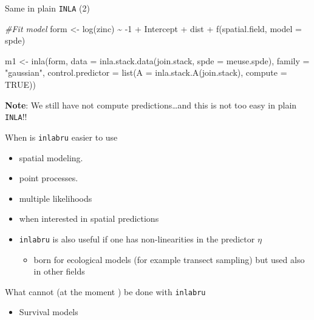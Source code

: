 \documentclass[
  ignorenonframetext,
]{beamer}
\newenvironment{Shaded}{\begin{snugshade}}{\end{snugshade}}
\newcommand{\AttributeTok}[1]{\textcolor[rgb]{0.77,0.63,0.00}{#1}}
\newcommand{\CommentTok}[1]{\textcolor[rgb]{0.56,0.35,0.01}{\textit{#1}}}
\newcommand{\ConstantTok}[1]{\textcolor[rgb]{0.00,0.00,0.00}{#1}}
\newcommand{\DecValTok}[1]{\textcolor[rgb]{0.00,0.00,0.81}{#1}}
\newcommand{\FunctionTok}[1]{\textcolor[rgb]{0.00,0.00,0.00}{#1}}
\newcommand{\NormalTok}[1]{#1}
\newcommand{\OtherTok}[1]{\textcolor[rgb]{0.56,0.35,0.01}{#1}}
\newcommand{\SpecialCharTok}[1]{\textcolor[rgb]{0.00,0.00,0.00}{#1}}
\newcommand{\StringTok}[1]{\textcolor[rgb]{0.31,0.60,0.02}{#1}}
\providecommand{\tightlist}{%
  \setlength{\itemsep}{0pt}\setlength{\parskip}{0pt}}
\begin{document}
\begin{frame}[fragile]{Same in plain \texttt{INLA} (2)}
\protect\hypertarget{same-in-plain-inla-2}{}
\tiny

\begin{Shaded}
\begin{Highlighting}[]
\CommentTok{\#Fit model}
\NormalTok{form }\OtherTok{\textless{}{-}} \FunctionTok{log}\NormalTok{(zinc) }\SpecialCharTok{\textasciitilde{}} \SpecialCharTok{{-}}\DecValTok{1} \SpecialCharTok{+}\NormalTok{ Intercept }\SpecialCharTok{+}\NormalTok{ dist }\SpecialCharTok{+} \FunctionTok{f}\NormalTok{(spatial.field, }\AttributeTok{model =}\NormalTok{ spde)}

\NormalTok{m1 }\OtherTok{\textless{}{-}} \FunctionTok{inla}\NormalTok{(form, }\AttributeTok{data =} \FunctionTok{inla.stack.data}\NormalTok{(join.stack, }\AttributeTok{spde =}\NormalTok{ meuse.spde),}
  \AttributeTok{family =} \StringTok{"gaussian"}\NormalTok{,}
  \AttributeTok{control.predictor =} \FunctionTok{list}\NormalTok{(}\AttributeTok{A =} \FunctionTok{inla.stack.A}\NormalTok{(join.stack), }\AttributeTok{compute =} \ConstantTok{TRUE}\NormalTok{))}
\end{Highlighting}
\end{Shaded}

\normalsize

\textbf{Note}: We still have not compute predictions\ldots and this is
not too easy in plain \texttt{INLA}!!
\end{frame}

\begin{frame}[fragile]{When is \texttt{inlabru} easier to use}
\protect\hypertarget{when-is-inlabru-easier-to-use}{}
\begin{itemize}
\item
  spatial modeling.
\item
  point processes.
\item
  multiple likelihoods
\item
  when interested in spatial predictions
\end{itemize}

\pause

\begin{itemize}
\item
  \texttt{inlabru} is also useful if one has non-linearities in the
  predictor \(\eta\)

  \begin{itemize}
  \tightlist
  \item
    born for ecological models (for example transect sampling) but used
    also in other fields
  \end{itemize}
\end{itemize}

\pause

What cannot (at the moment ) be done with \texttt{inlabru}

\begin{itemize}
\tightlist
\item
  Survival models
\end{itemize}
\end{frame}
\end{document}
